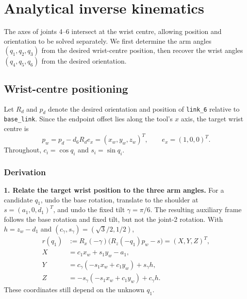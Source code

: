 \section{Analytical inverse kinematics}
\label{sec:analytical-ik}

The axes of joints 4--6 intersect at the wrist centre, allowing position and
orientation to be solved separately. We first determine the arm angles
$(q_1,q_2,q_3)$ from the desired wrist-centre position, then recover the wrist
angles $(q_4,q_5,q_6)$ from the desired orientation.

\subsection{Wrist-centre positioning}
\label{sec:ik-position}

Let $R_d$ and $p_d$ denote the desired orientation and position of
\texttt{link\_6} relative to \texttt{base\_link}. Since the endpoint offset lies
along the tool's $x$ axis, the target wrist centre is
\begin{equation}
 p_w=p_d-d_6R_de_x=(x_w,y_w,z_w)^T,
 \qquad e_x=(1,0,0)^T.
 \label{eq:ik-wrist-target}
\end{equation}
Throughout, $c_i=\cos q_i$ and $s_i=\sin q_i$.

\subsubsection*{Derivation}

\textbf{1. Relate the target wrist position to the three arm angles.}
For a candidate $q_1$, undo the base rotation, translate to the shoulder at
$s=(a_1,0,d_1)^T$, and undo the fixed tilt $\gamma=\pi/6$.
The resulting auxiliary frame follows the base rotation and fixed tilt, but
not the joint-2 rotation. With $h=z_w-d_1$ and $(c_\gamma,s_\gamma)=(\sqrt{3}/2,1/2)$,
\begin{equation}
 \begin{aligned}
 r(q_1)&:=R_x(-\gamma)\bigl(R_z(-q_1)p_w-s\bigr)=(X,Y,Z)^T,\\
 X&=c_1x_w+s_1y_w-a_1,\\
 Y&=c_\gamma(-s_1x_w+c_1y_w)+s_\gamma h,\\
 Z&=-s_\gamma(-s_1x_w+c_1y_w)+c_\gamma h.
 \end{aligned}
 \label{eq:ik-shoulder-coordinates}
\end{equation}
These coordinates still depend on the unknown $q_1$.

